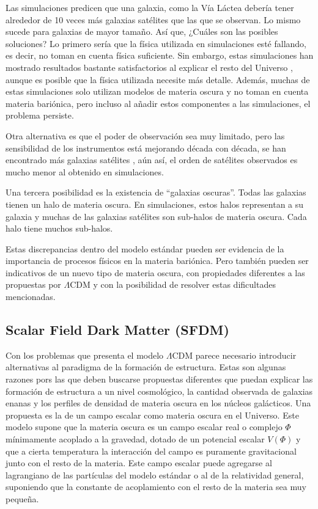 \documentclass[a4paper,openright,12pt]{book}
\begin{document}
Las simulaciones predicen que una galaxia, como la Vía Láctea debería tener alrededor de 10 veces más galaxias satélites que las que se observan. Lo mismo sucede para galaxias de mayor tamaño. Así que, ¿Cuáles son las posibles soluciones? Lo primero sería que la física utilizada en simulaciones esté fallando, es decir, no toman en cuenta física suficiente. Sin embargo, estas simulaciones han mostrado resultados bastante satisfactorios al explicar el resto del Universo \cite{1.2.5}, aunque es posible que la física utilizada necesite más detalle. Además, muchas de estas simulaciones solo utilizan modelos de materia oscura y no toman en cuenta materia bariónica, pero incluso al añadir estos componentes a las simulaciones, el problema persiste.

Otra alternativa es que el poder de observación sea muy limitado, pero las sensibilidad de los instrumentos está mejorando década con década, se han encontrado más galaxias satélites \cite{1.2.6}, aún así, el orden de satélites observados es mucho menor al obtenido en simulaciones.

Una tercera posibilidad es la existencia de ``galaxias oscuras''. Todas las galaxias tienen un halo de materia oscura. En simulaciones, estos halos representan a su galaxia y muchas de las galaxias satélites son sub-halos de materia oscura. Cada halo tiene muchos sub-halos. 

Estas discrepancias dentro del modelo estándar pueden ser evidencia de la importancia de procesos físicos en la materia bariónica. Pero también pueden ser indicativos de un nuevo tipo de materia oscura, con propiedades diferentes a las propuestas por $\Lambda$CDM y con la posibilidad de resolver estas dificultades mencionadas.





\subsection{Scalar Field Dark Matter (SFDM)}
Con los problemas que presenta el modelo $\Lambda$CDM parece necesario introducir alternativas al paradigma de la formación de estructura. Estas son algunas razones pors las que deben buscarse propuestas diferentes que puedan explicar las formación de estructura a un nivel cosmológico, la cantidad observada de galaxias enanas y los perfiles de densidad de materia oscura en los núcleos galácticos.
Una propuesta es la de un campo escalar como materia oscura en el Universo. Este modelo supone que la materia oscura es un campo escalar real o complejo $\Phi$ mínimamente acoplado a la gravedad, dotado de un potencial escalar $V(\Phi)$ y que a cierta temperatura la interacción  del campo es puramente gravitacional junto con el resto de la materia. Este campo escalar puede agregarse al lagrangiano de las partículas del modelo estándar o al de la relatividad general, suponiendo que la constante de acoplamiento con el resto de la materia sea muy pequeña.
\end{document}
